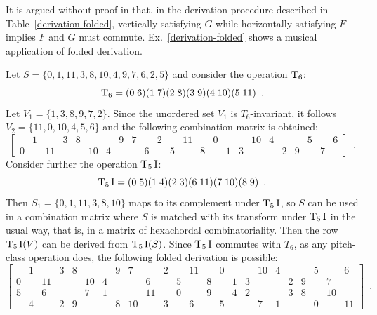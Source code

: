 It is argued without proof in \cite[215]{Starr1984} that, in the derivation procedure described in Table~\ref{derivation-folded}, vertically satisfying $G$ while horizontally satisfying $F$ implies $F$ and $G$ must commute. Ex.~\ref{derivation-folded} shows a musical application of folded derivation.

\begin{example}
    \cite[215]{Starr1984}
    \label{ex:derivation-folded}
    Let $S = \{ 0, 1, 11, 3, 8, 10, 4, 9, 7, 6, 2, 5 \}$ and consider the operation $\operatorname{T}_6$:
    \begin{equation}
        \operatorname{T}_6 = (0 \; 6) (1 \; 7) (2 \; 8) (3 \; 9) (4 \; 10) (5 \; 11) \enspace.
    \end{equation}
    Let $V_1 = \{ 1, 3, 8, 9, 7, 2 \}$. Since the unordered set $V_1$ is $T_6$-invariant, it follows $V_2 = \{ 11, 0, 10, 4, 5, 6 \}$ and the following combination matrix is obtained:
    \begin{equation}
        \left[
        \begin{array}{cccccccccccc|cccccccccccc}
            & 1 && 3 & 8 &&& 9 & 7 && 2 && 11 && 0 &&& 10 & 4 &&& 5 && 6 \\
            0 && 11 &&& 10 & 4 &&& 6 && 5 && 8 && 1 & 3 &&& 2 & 9 && 7 &  
        \end{array}
        \right] \enspace.
    \end{equation}
    Consider further the operation $\operatorname{T}_5\operatorname{I}$:
    \begin{equation}
        \operatorname{T}_5\operatorname{I} = (0 \; 5) (1 \; 4) (2 \; 3) (6 \; 11) (7 \; 10) (8 \; 9) \enspace.
    \end{equation}
    Then $S_1 = \{ 0, 1, 11, 3, 8, 10 \}$ maps to its complement under $\operatorname{T}_5\operatorname{I}$, so $S$ can be used in a combination matrix where $S$ is matched with its transform under $\operatorname{T}_5\operatorname{I}$ in the usual way, that is, in a matrix of hexachordal combinatoriality. Then the row $\operatorname{T}_5\operatorname{I}(V)$ can be derived from $\operatorname{T}_5\operatorname{I}(S)$. Since $\operatorname{T}_5\operatorname{I}$ commutes with $T_6$, as any pitch-class operation does, the following folded derivation is possible:
    \begin{equation}
        \left[
        \begin{array}{cccccccccccc|cccccccccccc}
            & 1 && 3 & 8 &&& 9 & 7 && 2 && 11 && 0 &&& 10 & 4 &&& 5 && 6 \\
            0 && 11 &&& 10 & 4 &&& 6 && 5 && 8 && 1 & 3 &&& 2 & 9 && 7 & \\
            \hline
            5 && 6 &&& 7 & 1 &&& 11 && 0 && 9 && 4 & 2 &&& 3 & 8 && 10 & \\
            & 4 && 2 & 9 &&& 8 & 10 && 3 && 6 && 5 &&& 7 & 1 &&& 0 && 11
        \end{array}
        \right] \enspace.
    \end{equation}
\end{example}

